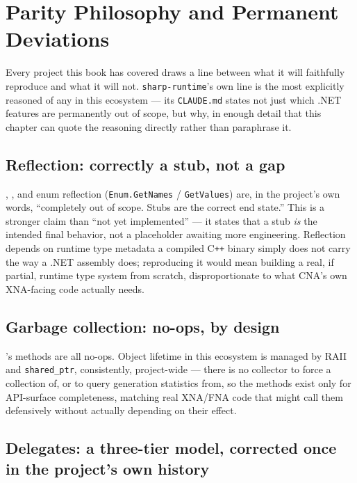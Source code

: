 \chapter{Parity Philosophy and Permanent Deviations}
\label{ch:parity-philosophy}

Every project this book has covered draws a line between what it will faithfully reproduce
and what it will not. \texttt{sharp-runtime}'s own line is the most explicitly reasoned of
any in this ecosystem --- its \texttt{CLAUDE.md} states not just which .NET features are
permanently out of scope, but why, in enough detail that this chapter can quote the reasoning
directly rather than paraphrase it.

\section{Reflection: correctly a stub, not a gap}

, , and enum reflection (\texttt{Enum.GetNames} /
\texttt{GetValues}) are, in the project's own words, ``completely out of scope. Stubs are the
correct end state.'' This is a stronger claim than ``not yet implemented'' --- it states that
a stub \emph{is} the intended final behavior, not a placeholder awaiting more engineering.
Reflection depends on runtime type metadata a compiled C\texttt{++} binary simply does not
carry the way a .NET assembly does; reproducing it would mean building a real, if partial,
runtime type system from scratch, disproportionate to what CNA's own XNA-facing code actually
needs.

\section{Garbage collection: no-ops, by design}

's methods are all no-ops. Object lifetime in this ecosystem is managed
by RAII and \texttt{shared\_ptr}, consistently, project-wide --- there is no collector to
force a collection of, or to query generation statistics from, so the methods exist only for
API-surface completeness, matching real XNA/FNA code that might call them defensively without
actually depending on their effect.

\section{Delegates: a three-tier model, corrected once in the project's own history}

